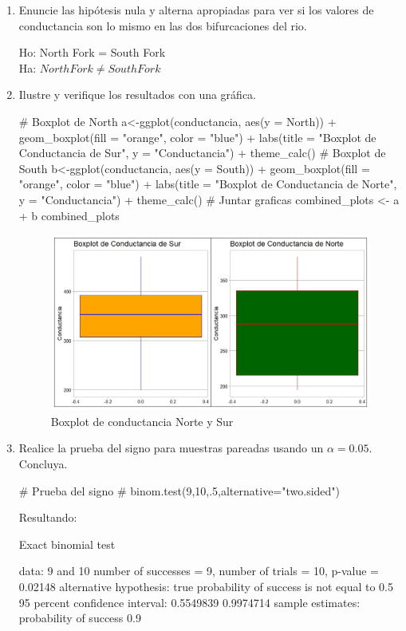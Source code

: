 \documentclass[a4paper,12pt]{article} %
\begin{document}
	\begin{enumerate} [label=\textbf{\alph*})]
		\item { Enuncie las hipótesis nula y alterna apropiadas para ver si los valores de conductancia son lo mismo en las dos bifurcaciones del rio.}\\
			\begin{center}
			Ho: North Fork = South Fork\\
			Ha: \(North Fork \neq South Fork\)
		\end{center}
		\item {Ilustre y verifique los resultados con una gráfica.}
\begin{MyVerbatim}
	# Boxplot de North
a<-ggplot(conductancia, aes(y = North)) +
geom_boxplot(fill = "orange", color = "blue") +
labs(title = "Boxplot de Conductancia de Sur",
y = "Conductancia") +
theme_calc()
	# Boxplot de South
b<-ggplot(conductancia, aes(y = South)) +
geom_boxplot(fill = "orange", color = "blue") +
labs(title = "Boxplot de Conductancia de Norte",
y = "Conductancia") +
theme_calc()
	# Juntar graficas
combined_plots <- a + b
combined_plots
\end{MyVerbatim}
\begin{figure}[H]
	\centering
	\includegraphics[width=0.7\linewidth]{2Box}
	\caption[2Box]{Boxplot de conductancia Norte y Sur}
	\label{fig:2box}
\end{figure}
\item {Realice la prueba del signo para muestras pareadas usando un \( \alpha = 0.05 \). Concluya.}
	\begin{MyVerbatim}
	# Prueba del signo #
binom.test(9,10,.5,alternative="two.sided")
	\end{MyVerbatim}
Resultando:
\begin{MyVerbatim}
	Exact binomial test
	
data:  9 and 10
number of successes = 9, number of trials = 10, p-value = 0.02148
alternative hypothesis: true probability of success is not equal to 0.5
95 percent confidence interval: 0.5549839 0.9974714
sample estimates: probability of success  0.9 
	

\end{MyVerbatim}
\end{enumerate}
\end{document}
